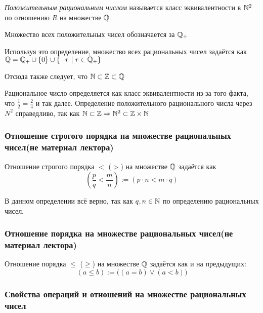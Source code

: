 \begin{definition}
    \textit{Положительным рациональным числом} называется класс эквивалентности в $\mathbb{N}^2$ по отношению $R$ на множестве $\mathbb{Q}$.
\end{definition}
    
Множество всех положительных чисел обозначается за $\mathbb{Q}_+$
    
Используя это определение, множество всех рациональных чисел задаётся как $\mathbb{Q} = \mathbb{Q}_+ \cup \{0\} \cup \{-r\ |\ r \in \mathbb{Q}_+\}$
    
Отсюда также следует, что $\mathbb{N} \subset \mathbb{Z} \subset \mathbb{Q}$ 

\begin{anote}
    Рациональное число определяется как класс эквивалентности из-за того факта, что $\frac{1}{2} = \frac{2}{4}$ и так далее. Определение положительного рационального числа через $N^2$ справедливо, так как $\mathbb{N} \subset \mathbb{Z} \Rightarrow \mathbb{N}^2 \subset \mathbb{Z} \times \mathbb{N}$
\end{anote}

\subsubsection*{Отношение строгого порядка на множестве рациональных чисел(не материал лектора)}

\begin{definition}
    Отношение строгого порядка $<$ ($>$) на множестве $\mathbb{Q}$ задаётся как
    \[
        \left(\frac{p}{q} < \frac{m}{n}\right) := (p \cdot n < m \cdot q)
    \]
\end{definition}

\begin{anote}
    В данном определении всё верно, так как $q, n \in \mathbb{N}$ по определению рациональных чисел.
\end{anote}

\subsubsection*{Отношение порядка на множестве рациональных чисел(не материал лектора)}

\begin{definition}
    Отношение порядка $\le$ ($\ge$) на множестве $\mathbb{Q}$ задаётся как и на предыдущих:
    \[
        (a \le b) := \big((a = b) \vee (a < b)\big)
    \]
\end{definition}

\subsubsection*{Свойства операций и отношений на множестве рациональных чисел}

